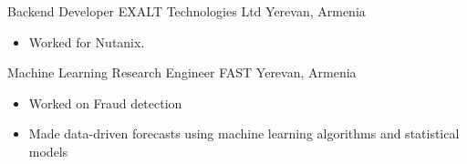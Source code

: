 \documentclass[10pt,a4paper,sans]{moderncv}        %
\newcommand{\yerevan}{Yerevan, Armenia}
\begin{document}
{Backend Developer}
{EXALT Technologies Ltd}
{\yerevan}
{}
{
  \begin{itemize}
  \item Worked for Nutanix.
  \end{itemize}
} %

{Machine Learning Research Engineer}
{FAST}
{\yerevan}
{}
{
  \begin{itemize}
  \item Worked on Fraud detection
  \item Made data-driven forecasts using machine learning algorithms and statistical models
  \end{itemize}
} %
\end{document}
